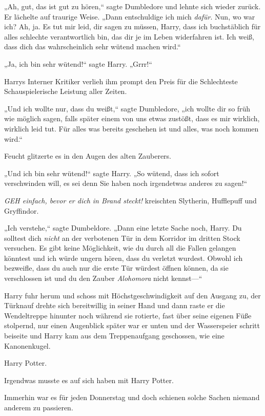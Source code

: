 {„Ah, gut, das ist gut zu hören,“ sagte Dumbledore und lehnte sich wieder zurück. Er lächelte auf traurige Weise. „Dann entschuldige ich mich \emph{dafür}. Nun, wo war ich? Ah, ja. Es tut mir leid, dir sagen zu müssen, Harry, dass ich buchstäblich für alles schlechte verantwortlich bin, das dir je im Leben widerfahren ist. Ich weiß, dass dich das wahrscheinlich sehr wütend machen wird.“

„Ja, ich bin sehr wütend!“ sagte Harry. „Grrr!“

Harrys Interner Kritiker verlieh ihm prompt den Preis für die Schlechteste Schauspielerische Leistung aller Zeiten.

„Und ich wollte nur, dass du weißt,“ sagte Dumbledore, „ich wollte dir so früh wie möglich sagen, falls später einem von uns etwas zustößt, dass es mir wirklich, wirklich leid tut. Für alles was bereits geschehen ist und alles, was noch kommen wird.“

Feucht glitzerte es in den Augen des alten Zauberers.

„Und ich bin sehr wütend!“ sagte Harry. „So wütend, dass ich sofort verschwinden will, es sei denn Sie haben noch irgendetwas anderes zu sagen!“

\emph{GEH einfach, bevor er dich in Brand steckt!} kreischten Slytherin, Hufflepuff und Gryffindor.

„Ich verstehe,“ sagte Dumbeldore. „Dann eine letzte Sache noch, Harry. Du solltest dich \emph{nicht} an der verbotenen Tür in dem Korridor im dritten Stock versuchen. Es gibt keine Möglichkeit, wie du durch all die Fallen gelangen könntest und ich würde ungern hören, dass du verletzt wurdest. Obwohl ich bezweifle, dass du auch nur die erste Tür würdest öffnen können, da sie verschlossen ist und du den Zauber \emph{Alohomora} nicht kennst—“

Harry fuhr herum und schoss mit Höchstgeschwindigkeit auf den Ausgang zu, der Türknauf drehte sich bereitwillig in seiner Hand und dann raste er die Wendeltreppe hinunter noch während sie rotierte, fast über seine eigenen Füße stolpernd, nur einen Augenblick später war er unten und der Wasserspeier schritt beiseite und Harry kam aus dem Treppenaufgang geschossen, wie eine Kanonenkugel.

\later

Harry Potter.

Irgendwas musste es auf sich haben mit Harry Potter.

Immerhin war es für jeden Donnerstag und doch schienen solche Sachen niemand anderem zu passieren.

}
